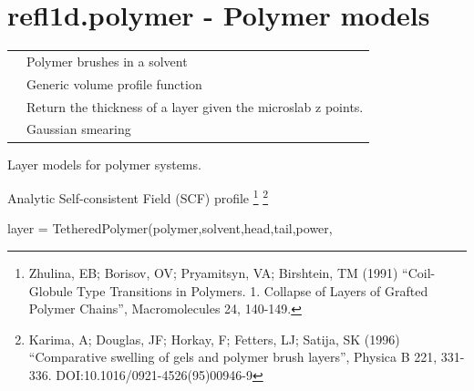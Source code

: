 \documentclass[letterpaper,10pt,english]{sphinxmanual}
\begin{document}
\section{refl1d.polymer - Polymer models}
\label{api/polymer:refl1d-polymer-polymer-models}\label{api/polymer::doc}
\begin{tabulary}{\linewidth}{LL}
\hline

{\hyperref[api/polymer:refl1d.polymer.PolymerBrush]{}}
 & 
Polymer brushes in a solvent
\\

{\hyperref[api/polymer:refl1d.polymer.VolumeProfile]{}}
 & 
Generic volume profile function
\\

{\hyperref[api/polymer:refl1d.polymer.layer_thickness]{}}
 & 
Return the thickness of a layer given the microslab z points.
\\

{\hyperref[api/polymer:refl1d.polymer.smear]{}}
 & 
Gaussian smearing
\\
\hline
\end{tabulary}

\label{api/polymer:module-refl1d.polymer}
Layer models for polymer systems.

Analytic Self-consistent Field (SCF) profile \footnote{
Zhulina, EB; Borisov, OV; Pryamitsyn, VA; Birshtein, TM (1991)
``Coil-Globule Type Transitions in Polymers. 1. Collapse of Layers
of Grafted Polymer Chains'', Macromolecules 24, 140-149.
} \footnote{
Karima, A; Douglas, JF; Horkay, F; Fetters, LJ; Satija, SK (1996)
``Comparative swelling of gels and polymer brush layers'',
Physica B 221, 331-336. DOI:10.1016/0921-4526(95)00946-9
}

layer = TetheredPolymer(polymer,solvent,head,tail,power,
\end{document}
